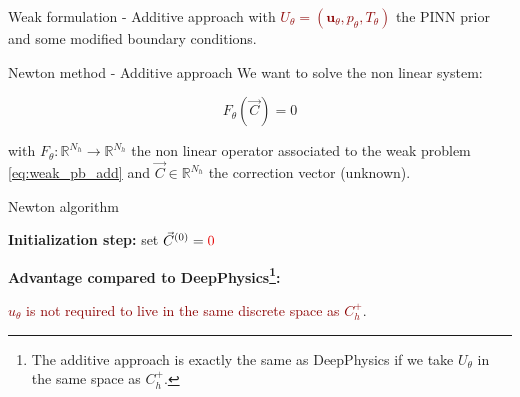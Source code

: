 \begin{frame}{Weak formulation - Additive approach}
    \vspace{5pt}
    with \textcolor{darkred}{$U_\theta = (\bm{u}_\theta, p_\theta, T_\theta)$} the PINN prior and some modified boundary conditions.
\end{frame}

\begin{frame}{Newton method - Additive approach}
    \vspace{-5pt}
    We want to solve the non linear system: %

    \normalsize
    \vspace{-10pt}
    \begin{equation*}
        F_\theta(\vec{C}) = 0 
    \end{equation*}

    \vspace{-2pt}
    with $F_\theta:\mathbb{R}^{N_h} \to \mathbb{R}^{N_h}$ the non linear operator associated to the weak problem \eqref{eq:weak_pb_add} and $\vec{C}\in \mathbb{R}^{N_h}$ the correction vector (unknown).

	\setcounter{algocf}{1}
    \begin{center}
        \small
        \begin{minipage}{0.9\linewidth}
            \begin{algorithm}[H]
                \SetAlgoLined
                \caption{Newton algorithm \citep{newton_accel_2025}}
                \textbf{Initialization step:} set $\vec{C}^{(0)} = \textcolor{darkred}{0}$\;
            \end{algorithm}
        \end{minipage}
    \end{center}
    
    \vspace{3pt}
    \textbf{Advantage compared to DeepPhysics\footnote[frame,1]{The additive approach is exactly the same as DeepPhysics if we take $U_\theta$ in the same space as $C_h^+$.}:} 

    \vspace{-2pt}
    \begin{center}
        \textcolor{darkred}{$u_\theta$ is not required to live in the same discrete space as $C_h^+$}.
    \end{center}
    \vspace{8pt}
\end{frame}